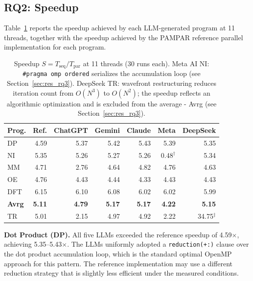 \documentclass[conference]{IEEEtran}
\begin{document}
\subsection{RQ2: Speedup} \label{sec:res_rq2}

Table~\ref{tab:speedup} reports the speedup achieved by each LLM-generated program at 11 threads, together with the speedup achieved by the PAMPAR reference parallel implementation for each program.

\begin{table}[tbp]
\centering
\caption{Speedup $S = T_{\text{seq}} / T_{\text{par}}$ at 11 threads (30 runs each). 
Meta AI NI: \texttt{\#pragma omp ordered} serializes the accumulation loop (see Section~\ref{sec:res_rq3}). 
DeepSeek TR: wavefront restructuring reduces iteration count from $O(N^3)$ to $O(N^2)$; the speedup reflects an algorithmic optimization and is excluded from the average - Avrg (see Section~\ref{sec:res_rq3}).} 
\label{tab:speedup}
\begin{tabular}{lrrrrrr}
\toprule
\textbf{Prog.} & \textbf{Ref.} & \textbf{ChatGPT} & \textbf{Gemini} & \textbf{Claude} & \textbf{Meta} & \textbf{DeepSeek} \\ %
\midrule
DP  & 4.59 & 5.37 & 5.42 & 5.43 & 5.39 & 5.35 \\
NI  & 5.35 & 5.26 & 5.27 & 5.26 & 0.48$^\dagger$ & 5.34 \\
MM  & 4.71 & 2.76 & 4.64 & 4.82 & 4.76 & 4.63 \\
OE  & 4.76 & 4.43 & 4.44 & 4.33 & 4.43 & 4.43 \\
DFT & 6.15 & 6.10 & 6.08 & 6.02 & 6.02 & 5.99 \\
\midrule
\textbf{Avrg} &
\textbf{5.11} & \textbf{4.79} & \textbf{5.17} & \textbf{5.17} & \textbf{4.22} & \textbf{5.15} \\
\midrule
TR  & 5.01 & 2.15 & 4.97 & 4.92 & 2.22 & 34.75$^\ddagger$ \\
\bottomrule
\end{tabular}
\end{table}

\textbf{Dot Product (DP).} All five LLMs exceeded the reference speedup of 4.59$\times$, achieving 5.35--5.43$\times$. The LLMs uniformly adopted a \texttt{reduction(+:)} clause over the dot product accumulation loop, which is the standard optimal OpenMP approach for this pattern. The reference implementation may use a different reduction strategy that is slightly less efficient under the measured conditions.
\end{document}
